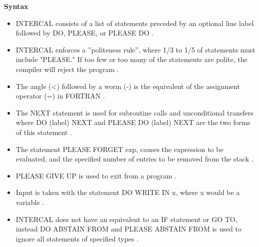 \documentclass{article}
\begin{document}
\textbf{Syntax}
\begin{itemize}
    \item INTERCAL consists of a list of statements preceded by an optional line label followed by DO, PLEASE, or PLEASE DO \cite{Woods}.  
\end{itemize}
\begin{itemize}
    \item INTERCAL enforces a ''politeness rule'', where 1/3 to 1/5 of statements must include "PLEASE." If too few or too many of the statements are polite, the compiler will reject the program \cite{Woods}.
\end{itemize}
\begin{itemize}
    \item The angle (<) followed by a worm (-) is the equivalent of the assignment operator (=) in FORTRAN \cite{Woods}.
\end{itemize}
\begin{itemize}
    \item The NEXT statement is used for subroutine calls and unconditional transfers where DO (label) NEXT and PLEASE DO (label) NEXT are the two forms of this statement \cite{Woods}.
\end{itemize}
\begin{itemize}
    \item The statement PLEASE FORGET exp, causes the expression to be evaluated, and the specified number of entries to be removed from the stack \cite{Woods}. 
\end{itemize}
\begin{itemize}
    \item PLEASE GIVE UP is used to exit from a program \cite{Woods}. 
\end{itemize}
\begin{itemize}
    \item Input is taken with the statement DO WRITE IN x, where x would be a variable \cite{Woods}.
\end{itemize}
\begin{itemize}
    \item INTERCAL does not have an equivalent to an IF statement or GO TO, instead DO ABSTAIN FROM and PLEASE ABSTAIN FROM is used to ignore all statements of specified types \cite{Woods}.
\end{itemize}
\cite{Woods}
\end{document}

